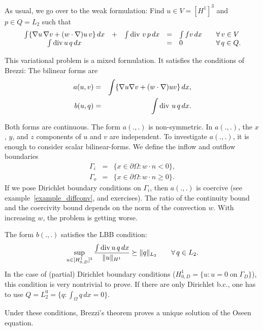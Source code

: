 \bigskip

As usual, we go over to the weak formulation: Find $u \in V = [H^1]^3$ and $p \in Q = L_2$
such that
\begin{equation} \label{equ_weakoseen}
\begin{array}{ccccll}
\int \{ \nabla u \, \nabla v + (w\cdot \nabla) u \, v \} \, dx & + & \int \operatorname{div} \, v \, p \, dx & = & \int f v \, dx \quad  & \forall \, v \in V \\
\int \operatorname{div} u \, q \, dx & & & = & 0  & \forall \, q \in Q.
\end{array}
\end{equation}

This variational problem is a mixed formulation. It satisfies the conditions of Brezzi:
The bilinear forms are
\begin{eqnarray*}
a(u,v) & = & \int \{ \nabla u \nabla v + (w\cdot \nabla) u v \} \, dx, \\
b(u,q) & = & \int \operatorname{div} \, u \, q \, dx.
\end{eqnarray*}

Both forms are continuous. The form $a(.,.)$ is non-symmetric.
In $a(.,.)$, the $x$, $y$, and $z$ components of $u$ and $v$ are independent. 
To investigate $a(.,.)$, it is enough to consider scalar bilinear-forms. 
We define the inflow and outflow boundaries
\begin{eqnarray*}
\Gamma_i & = & \{ x \in \partial \Omega : w \cdot n < 0 \}, \\
\Gamma_o & = & \{ x \in \partial \Omega : w \cdot n \geq 0 \}.
\end{eqnarray*}
If we pose Dirichlet boundary conditions on $\Gamma_i$, then $a(.,.)$ is 
coercive (see example~\ref{example_diffconv}, and exercises). 
The ratio of the continuity bound and the coercivity bound depends on the
norm of the convection $w$. With increasing $w$, the problem is getting worse.


The form $b(.,.)$ satisfies the LBB condition:
$$
\sup_{u \in [H_{0,D}^1]^3} \frac{ \int \operatorname{div} u \, q \, dx } { \| u \|_{H^1} } \succeq \| q \|_{L_2} \qquad \forall \, q \in L_2.
$$
In the case of (partial) Dirichlet boundary conditions ($H_{0,D}^1 = \{ u : u = 0 \; \mbox{on} \; \Gamma_D \}$), this condition is very nontrivial to prove. If there are only Dirichlet b.c.,
one has to use $Q = L_2^0 = \{ q : \int_\Omega q \, dx = 0 \}$.

Under these conditions, Brezzi's theorem proves a unique solution of the Oseen equation.

\bigskip

